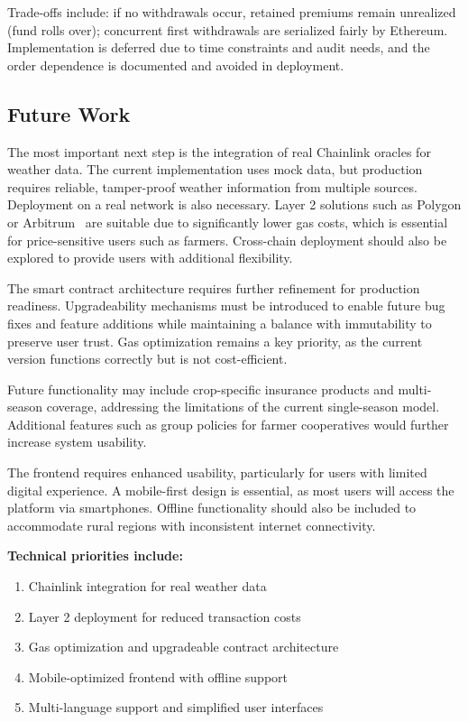 \documentclass[11pt,a4paper]{article}
\begin{document}
        Trade-offs include: if no withdrawals occur, retained premiums remain unrealized (fund rolls over); concurrent first withdrawals are serialized fairly by Ethereum.
        Implementation is deferred due to time constraints and audit needs, and the order dependence is documented and avoided in deployment.


		\subsection{Future Work}\label{subsec:future-work}
		The most important next step is the integration of real Chainlink oracles for weather data.
		The current implementation uses mock data, but production requires reliable, tamper-proof weather information from multiple sources.
		Deployment on a real network is also necessary.
		Layer 2\footnotemark{} solutions such as Polygon or Arbitrum~\footnotemark{} are suitable due to significantly lower gas costs, which is essential for price-sensitive users such as farmers.
		Cross-chain deployment should also be explored to provide users with additional flexibility.

		The smart contract architecture requires further refinement for production readiness.
		Upgradeability mechanisms must be introduced to enable future bug fixes and feature additions while maintaining a balance with immutability to preserve user trust.
		Gas optimization remains a key priority, as the current version functions correctly but is not cost-efficient.

		Future functionality may include crop-specific insurance products and multi-season coverage, addressing the limitations of the current single-season model.
		Additional features such as group policies for farmer cooperatives would further increase system usability.

		The frontend requires enhanced usability, particularly for users with limited digital experience.
		A mobile-first design is essential, as most users will access the platform via smartphones.
		Offline functionality should also be included to accommodate rural regions with inconsistent internet connectivity.

        \pagebreak

		\textbf{Technical priorities include:}

		\begin{enumerate}
			\item Chainlink integration for real weather data
			\item Layer 2 deployment for reduced transaction costs
			\item Gas optimization and upgradeable contract architecture
			\item Mobile-optimized frontend with offline support
			\item Multi-language support and simplified user interfaces
		\end{enumerate}
\end{document}
